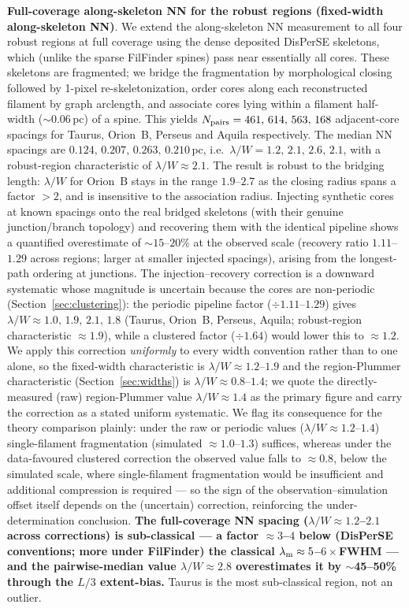 \documentclass[usenatbib,twoside,twocolumn]{mnras}
\begin{document}
\textbf{Full-coverage along-skeleton NN for the robust regions (fixed-width along-skeleton NN)}. We extend the along-skeleton NN measurement to all four robust regions at full coverage using the dense deposited DisPerSE skeletons, which (unlike the sparse FilFinder spines) pass near essentially all cores. These skeletons are fragmented; we bridge the fragmentation by morphological closing followed by 1-pixel re-skeletonization, order cores along each reconstructed filament by graph arclength, and associate cores lying within a filament half-width ($\sim$0.06\,pc) of a spine. This yields $N_{\rm pairs} = 461,\,614,\,563,\,168$ adjacent-core spacings for Taurus, Orion~B, Perseus and Aquila respectively. The median NN spacings are $0.124,\,0.207,\,0.263,\,0.210$\,pc, i.e.\ $\lambda/W = 1.2,\,2.1,\,2.6,\,2.1$, with a robust-region characteristic of $\lambda/W \approx 2.1$. The result is robust to the bridging length: $\lambda/W$ for Orion~B stays in the range $1.9$--$2.7$ as the closing radius spans a factor $>2$, and is insensitive to the association radius. Injecting synthetic cores at known spacings onto the real bridged skeletons (with their genuine junction/branch topology) and recovering them with the identical pipeline shows a quantified overestimate of $\sim$$15$--$20$\% at the observed scale (recovery ratio $1.11$--$1.29$ across regions; larger at smaller injected spacings), arising from the longest-path ordering at junctions. The injection--recovery correction is a downward systematic whose magnitude is uncertain because the cores are non-periodic (Section~\ref{sec:clustering}): the periodic pipeline factor ($\div1.11$--$1.29$) gives $\lambda/W\approx1.0,\,1.9,\,2.1,\,1.8$ (Taurus, Orion~B, Perseus, Aquila; robust-region characteristic $\approx1.9$), while a clustered factor ($\div1.64$) would lower this to $\approx1.2$. We apply this correction \emph{uniformly} to every width convention rather than to one alone, so the fixed-width characteristic is $\lambda/W\approx1.2$--$1.9$ and the region-Plummer characteristic (Section~\ref{sec:widths}) is $\lambda/W\approx0.8$--$1.4$; we quote the directly-measured (raw) region-Plummer value $\lambda/W\approx1.4$ as the primary figure and carry the correction as a stated uniform systematic. We flag its consequence for the theory comparison plainly: under the raw or periodic values ($\lambda/W\approx1.2$--$1.4$) single-filament fragmentation (simulated $\approx1.0$--$1.3$) suffices, whereas under the data-favoured clustered correction the observed value falls to $\approx0.8$, below the simulated scale, where single-filament fragmentation would be insufficient and additional compression is required --- so the sign of the observation--simulation offset itself depends on the (uncertain) correction, reinforcing the under-determination conclusion. \textbf{The full-coverage NN spacing ($\lambda/W\approx1.2$--$2.1$ across corrections) is sub-classical --- a factor $\approx3$--$4$ below (DisPerSE conventions; more under FilFinder) the classical $\lambda_{\rm m}\approx5$--$6\times$FWHM --- and the pairwise-median value $\lambda/W\approx2.8$ overestimates it by $\sim$45--50\% through the $L/3$ extent-bias.} Taurus is the most sub-classical region, not an outlier.
\end{document}

